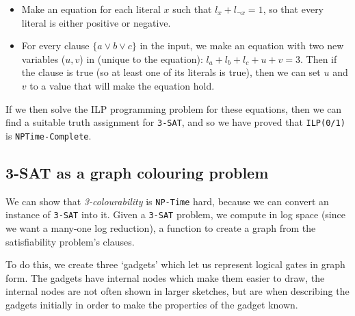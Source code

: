 \begin{itemize}
  \item Make an equation for each literal $x$ such that $l_x + l_{\neg x} = 1$,
  so that every literal is either positive or negative.

  \item For every clause $\{a \vee b \vee c\}$ in the input, we make an 
  equation with two new variables ($u,v$) in (unique to the equation):
  $l_a + l_b + l_c + u + v = 3$. Then if the clause is true (so at least one of 
  its literals is true), then we can set $u$ and $v$ to a value that will make 
  the equation hold.
\end{itemize}


If we then solve the ILP programming problem for these equations, then we can
find a suitable truth assignment for \texttt{3-SAT}, and so we have proved that
\texttt{ILP(0/1)} is \texttt{NPTime-Complete}.

\subsection{3-SAT as a graph colouring problem}
\label{sat-colour}

We can show that \textit{3-colourability} is \texttt{NP-Time} hard, because we
can convert an instance of \texttt{3-SAT} into it. Given a \texttt{3-SAT}
problem, we compute in log space (since we want a many-one log reduction), a
function to create a graph from the satisfiability problem's clauses.

To do this, we create three `gadgets' which let us represent logical gates in
graph form. The gadgets have internal nodes which make them easier to draw, the
internal nodes are not often shown in larger sketches, but are when describing
the gadgets initially in order to make the properties of the gadget known.


